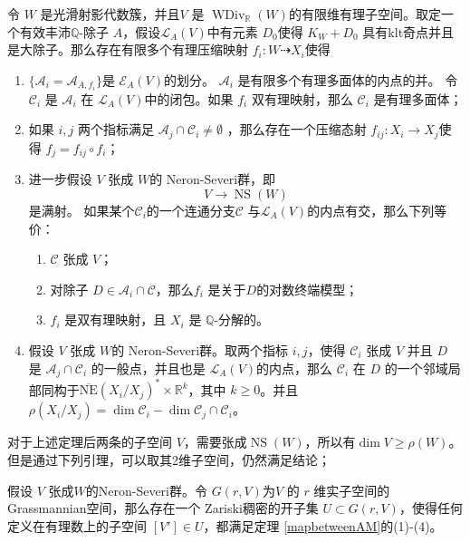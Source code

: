 \begin{theorem}\label{mapbetweenAM}
  \cite[Theorem 3.3]{haconSarkisovProgram2012} 令 $W$ 是光滑射影代数簇，并且$ V $ 是 $ \operatorname{WDiv}_{\mathbb{R}}(W) $的有限维有理子空间。取定一个有效丰沛$\mathbb{Q}$-除子 $A$，假设$\mathcal{L}_{A}(V)$中有元素 $D_{0}$使得 $K_{W}+D_{0}$ 具有klt奇点并且是大除子。那么存在有限多个有理压缩映射 $ f_i:W\dashrightarrow X_i $使得 
  \begin{enumerate}
    \item $ \{\mathcal{A}_i=\mathcal{A}_{A,f_i}\} $是 $ \mathcal{E}_{A}(V) $的划分。 $ \mathcal{A}_{i} $ 是有限多个有理多面体的内点的并。 令$\mathcal{C}_{i}$ 是 $\mathcal{A}_{i}$ 在 $\mathcal{L}_{A}(V)$中的闭包。如果 $ f_i $ 双有理映射，那么 $ \mathcal{C}_i$ 是有理多面体；
    \item 如果 $ i,j $ 两个指标满足 $ \mathcal{A}_j\cap \mathcal{C}_i\neq \emptyset $ ，那么存在一个压缩态射 $ f_{ij}:X_i\to X_j $使得 $ f_j=f_{ij}\circ f_i $；
    \item 进一步假设 $ V $ 张成 $W$的 Neron-Severi群，即
          \[ V \to \operatorname{NS}(W) \]
          是满射。 如果某个$ \mathcal{C}_i $的一个连通分支$ \mathcal{C} $ 与$ \mathcal{L}_A(V) $的内点有交，那么下列等价：
          \begin{enumerate}
            \item $ \mathcal{C} $ 张成 $ V $；
            \item 对除子 $ D\in \mathcal{A}_i\cap \mathcal{C} $，那么$ f_i $ 是关于$ D $的对数终端模型；
            \item $ f_i $ 是双有理映射，且 $ X_i $ 是 $ \mathbb{Q} $-分解的。
          \end{enumerate}
    \item 假设 $ V $ 张成 $W$的 Neron-Severi群。取两个指标 $ i,j $，使得 $ \mathcal{C}_i $ 张成 $ V $ 并且 $ D $ 是 $ \mathcal{A}_j\cap \mathcal{C}_i $ 的一般点，并且也是 $ \mathcal{L}_A(V) $的内点，那么 $ \mathcal{C}_i $ 在 $D$ 的一个邻域局部同构于$ \overline{\mathrm{NE}}(X_i/X_j)^*\times \mathbb{R}^k $，其中 $ k\geqslant 0 $。并且 $ \rho(X_i/X_j)=\dim  \mathcal{C}_i-\dim \mathcal{C}_j\cap \mathcal{C}_i   $。
  \end{enumerate}
\end{theorem}
对于上述定理后两条的子空间 $V$，需要张成$\operatorname{NS}(W)$，所以有$\dim V \geqslant \rho(W)$。但是通过下列引理，可以取其2维子空间，仍然满足结论；
\begin{lemma}\label{subspace}
  \cite[Corollary 3.4]{haconSarkisovProgram2012} 假设 $V$ 张成$W$的Neron-Severi群。令 $G(r, V)$为$V$ 的 $r$ 维实子空间的 Grassmannian空间，那么存在一个  Zariski稠密的开子集  $U \subset G(r, V)$，使得任何定义在有理数上的子空间  $[V']\in U$，都满足定理 \ref{mapbetweenAM}的(1)-(4)。
\end{lemma}

